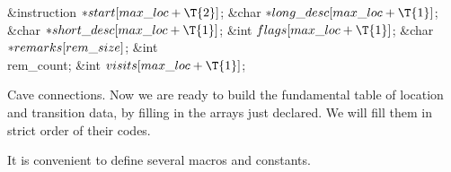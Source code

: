 \&{instruction} ${}{*}\\{start}[\\{max\_loc}+\T{2}]{}$;\6
\&{char} ${}{*}\\{long\_desc}[\\{max\_loc}+\T{1}]{}$;\6
\&{char} ${}{*}\\{short\_desc}[\\{max\_loc}+\T{1}]{}$;\6
\&{int} ${}\\{flags}[\\{max\_loc}+\T{1}]{}$;\6
\&{char} ${}{*}\\{remarks}[\\{rem\_size}]{}$;\6
\&{int} \\{rem\_count};\6
\&{int} ${}\\{visits}[\\{max\_loc}+\T{1}]{}$;\par
\fi

Cave connections. Now we are ready to build the fundamental table
of location and transition data, by filling in the arrays just declared.
We will fill them in strict order of their  codes.

It is convenient to define several macros and constants.

